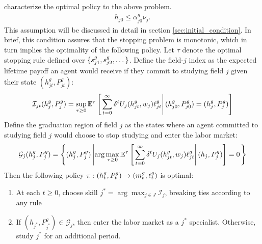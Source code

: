 \textcite{AF20} characterize the optimal policy to the above problem.
\begin{align}
    h_{j0} \leq \alpha_{j0}^g \nu_{j}. \label{eq:h_leq_alpha_v}
\end{align} 
This assumption will be discussed in detail in section \ref{sec:initial_condition}.
In brief, this condition assures that the stopping problem is monotonic, which in turn implies the optimality of the following policy.
Let $\tau$ denote the optimal stopping rule defined over $\{s_{j1}^g, s_{j2}^g, \dots\}$. 
Define the field-$j$ index as the expected lifetime payoff an agent would receive if they commit to studying field $j$ given their state $(h_{jt}^g, P_{jt}^g)$: 
\begin{equation}\label{eq:index_general}
\mathcal{I}_{jt} (h_{j}^g, P_{j}^g) = \sup_{\tau \geq 0} \mathbb{E}^\tau
\left[\left. 
   \sum_{t=0}^\infty \delta^t 
   U_j(h_{jt}^g, w_j) \ell_{jt}^g
 \right\vert 
    (h_{j0}^g, P_{j0}^g) = (h_{j}^g, P_{j}^g)
 \right]
\end{equation}
Define the graduation region of field $j$ as the states where an agent committed to studying field $j$ would choose to stop studying and enter the labor market: 
\begin{equation}\label{eq:graduation_general}
\mathcal{G}_j (h_{j}^g, P_{j}^g)  = 
    \left\{
        (h_{j}^g, P_{j}^g) 
        \left\vert
            \arg \max_{\tau \geq 0} 
            \mathbb{E}^\tau 
            \left[\left. 
                \sum_{t=0}^\infty \delta^t 
                U_j(h_{jt}^g, w_j) \ell_{jt}^g
             \right\vert 
                (h_j, P_j^g)
             \right] = 0
   \right. \right\}
\end{equation}
Then the following policy $\pi: (h_{t}^g, P_{t}^g) \to (m_{t}^g, \ell_t^g)$ is optimal: 
\begin{enumerate}
    \item At each $t \geq 0$, choose skill $j^* = \arg \max_{j \in J} \mathcal{I}_j$, breaking ties according to any rule
    \item If $(h_{j^*}, P_{j^*}^g) \in \mathcal{G}_{j}$, then enter the labor market as a $j^*$ specialist. Otherwise, study $j^*$ for an additional period.  
\end{enumerate}

